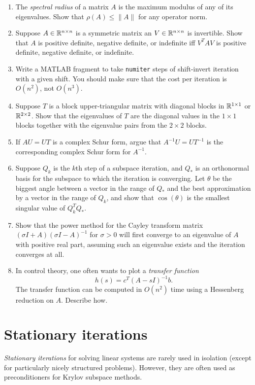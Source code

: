 \documentclass[12pt, leqno]{article}
\begin{document}
\begin{enumerate}
\item
  The {\em spectral radius} of a matrix $A$ is the maximum modulus
  of any of its eigenvalues.  Show that $\rho(A) \leq \|A\|$ for
  any operator norm.
\item
  Suppose $A \in \mathbb{R}^{n \times n}$ is a symmetric matrix an
  $V \in \mathbb{R}^{n \times n}$ is invertible.  Show that $A$ is positive
  definite, negative definite, or indefinite iff $V^T A V$ is positive
  definite, negative definite, or indefinite.
\item
  Write a MATLAB fragment to take {\tt numiter} steps of shift-invert iteration
  with a given shift.  You should make sure that the cost per
  iteration is $O(n^2)$, not $O(n^3)$.
\item
  Suppose $T$ is a block upper-triangular matrix with diagonal blocks
  in $\mathbb{R}^{1 \times 1}$ or $\mathbb{R}^{2 \times 2}$.  Show that the
  eigenvalues of $T$ are the diagonal values in the $1 \times 1$
  blocks together with the eigenvalue pairs from the $2 \times 2$
  blocks.
\item
  If $A U = U T$ is a complex Schur form, argue that
  $A^{-1} U = U T^{-1}$ is the corresponding complex Schur form for $A^{-1}$.
\item
  Suppose $Q_k$ is the $k$th step of a subspace iteration, and $Q_*$
  is an orthonormal basis for the subspace to which the iteration is
  converging.  Let $\theta$ be the biggest angle between a vector in
  the range of $Q_*$ and the best approximation by a vector in the
  range of $Q_k$, and show that $\cos(\theta)$ is the smallest singular
  value of $Q_k^T Q_*$.
\item
  Show that the power method for the Cayley transform matrix $(\sigma
  I + A) (\sigma I - A)^{-1}$ for $\sigma > 0$ will first converge to
  an eigenvalue of $A$ with positive real part, assuming such an
  eigenvalue exists and the iteration converges at all.
\item
  In control theory, one often wants to plot a {\em transfer function}
  \[
    h(s) = c^T (A-sI)^{-1} b.
  \]
  The transfer function can be computed in $O(n^2)$ time using a
  Hessenberg reduction on $A$.  Describe how.
\end{enumerate}

\section{Stationary iterations}

{\em Stationary iterations} for solving linear systems are rarely used
in isolation (except for particularly nicely structured problems).
However, they are often used as preconditioners for Krylov subspace
methods.
\end{document}

